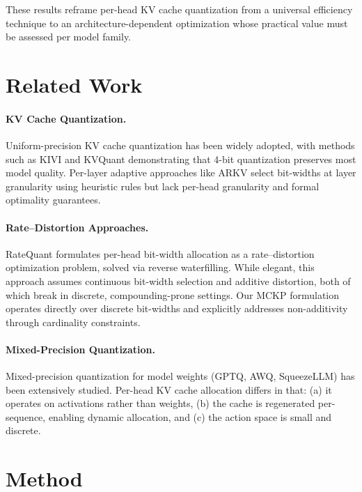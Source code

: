 \documentclass[11pt]{article}
\begin{document}
These results reframe per-head KV cache quantization from a universal efficiency technique to an architecture-dependent optimization whose practical value must be assessed per model family.

\section{Related Work}

\paragraph{KV Cache Quantization.}
Uniform-precision KV cache quantization has been widely adopted, with methods such as KIVI and KVQuant demonstrating that 4-bit quantization preserves most model quality.
Per-layer adaptive approaches like ARKV select bit-widths at layer granularity using heuristic rules but lack per-head granularity and formal optimality guarantees.

\paragraph{Rate--Distortion Approaches.}
RateQuant formulates per-head bit-width allocation as a rate--distortion optimization problem, solved via reverse waterfilling.
While elegant, this approach assumes continuous bit-width selection and additive distortion, both of which break in discrete, compounding-prone settings.
Our MCKP formulation operates directly over discrete bit-widths and explicitly addresses non-additivity through cardinality constraints.

\paragraph{Mixed-Precision Quantization.}
Mixed-precision quantization for model weights (GPTQ, AWQ, SqueezeLLM) has been extensively studied. Per-head KV cache allocation differs in that: (a) it operates on activations rather than weights, (b) the cache is regenerated per-sequence, enabling dynamic allocation, and (c) the action space is small and discrete.

\section{Method}
\label{sec:method}
\end{document}
